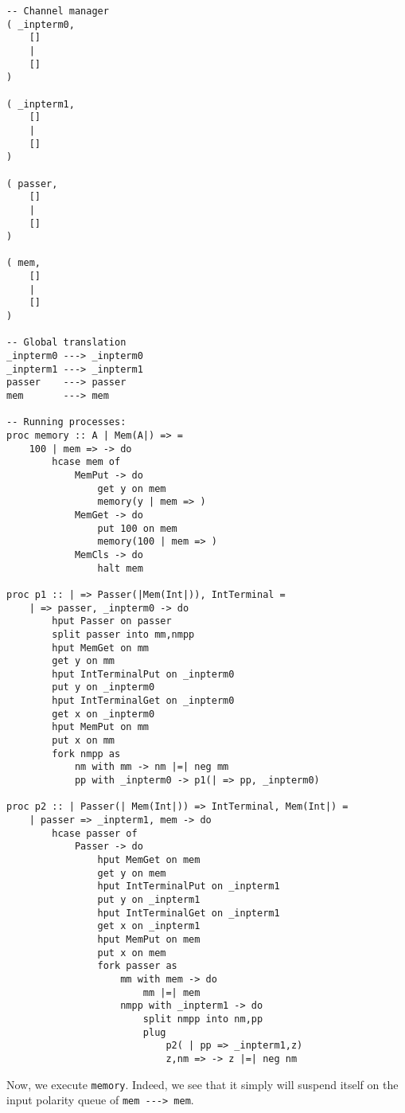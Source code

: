 \documentclass{article}
\theoremstyle{plain}%
\theoremstyle{definition}
\theoremstyle{remark}
\begin{document}
\begin{verbatim}
-- Channel manager
( _inpterm0,  
    []
    |
    []
)

( _inpterm1,  
    []
    |
    []
)

( passer,
    []
    |
    []
)

( mem,
    []
    |
    []
)

-- Global translation
_inpterm0 ---> _inpterm0 
_inpterm1 ---> _inpterm1 
passer    ---> passer 
mem       ---> mem

-- Running processes:
proc memory :: A | Mem(A|) => =
    100 | mem => -> do
        hcase mem of
            MemPut -> do
                get y on mem
                memory(y | mem => )
            MemGet -> do
                put 100 on mem
                memory(100 | mem => )
            MemCls -> do
                halt mem

proc p1 :: | => Passer(|Mem(Int|)), IntTerminal = 
    | => passer, _inpterm0 -> do
        hput Passer on passer
        split passer into mm,nmpp
        hput MemGet on mm 
        get y on mm
        hput IntTerminalPut on _inpterm0
        put y on _inpterm0
        hput IntTerminalGet on _inpterm0
        get x on _inpterm0
        hput MemPut on mm
        put x on mm
        fork nmpp as
            nm with mm -> nm |=| neg mm
            pp with _inpterm0 -> p1(| => pp, _inpterm0)

proc p2 :: | Passer(| Mem(Int|)) => IntTerminal, Mem(Int|) =
    | passer => _inpterm1, mem -> do
        hcase passer of
            Passer -> do
                hput MemGet on mem
                get y on mem
                hput IntTerminalPut on _inpterm1
                put y on _inpterm1
                hput IntTerminalGet on _inpterm1
                get x on _inpterm1
                hput MemPut on mem
                put x on mem
                fork passer as
                    mm with mem -> do
                        mm |=| mem
                    nmpp with _inpterm1 -> do
                        split nmpp into nm,pp
                        plug
                            p2( | pp => _inpterm1,z)
                            z,nm => -> z |=| neg nm

\end{verbatim}
Now, we execute \verb|memory|. Indeed, we see that it simply will suspend itself on the input polarity queue of \verb|mem ---> mem|.
\end{document}
